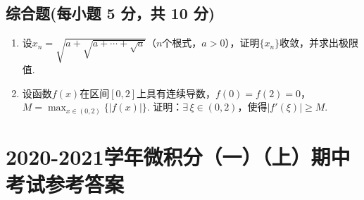 \documentclass[../Main.tex]{subfiles}
\begin{document}
  \section{综合题(每小题 5 分，共 10 分)}
  \begin{enumerate}
    \item[19.] 设$x_{n}=\sqrt{a+\sqrt{a+\cdots+\sqrt{a}}}$（$n$个根式，$a>0$），证明$\{
      x_{n}\}$收敛，并求出极限值.
      \vspace{18em}

    \item[20.] 设函数$f(x)$在区间$[0,2]$上具有连续导数，$f(0)=f(2)=0$，$M=\max_{x\in(0,2)}
      \{|f(x)|\}$. 证明：$\exists\,\xi\in(0,2)$，使得$|f'(\xi)|\geq M$.
  \end{enumerate}

  \chapter{2020-2021学年微积分（一）（上）期中考试参考答案}
\end{document}
